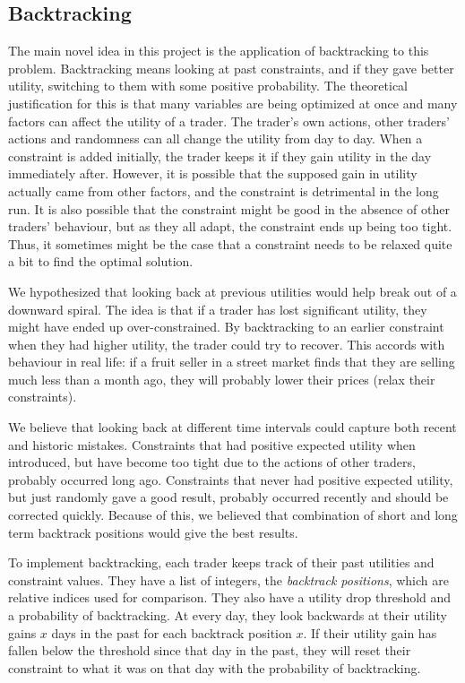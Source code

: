 \documentclass[12pt,a4paper,titlepage]{article}
\begin{document}
\subsection{Backtracking}\label{backtrack}

The main novel idea in this project is the application of backtracking to this problem.
Backtracking means looking at past constraints, and if they gave better utility, switching to them with some positive probability.
The theoretical justification for this is that many variables are being optimized at once and many factors can affect the utility of a trader.
The trader's own actions, other traders' actions and randomness can all change the utility from day to day.
When a constraint is added initially, the trader keeps it if they gain utility in the day immediately after.
However, it is possible that the supposed gain in utility actually came from other factors, and the constraint is detrimental in the long run.
It is also possible that the constraint might be good in the absence of other traders' behaviour, but as they all adapt, the constraint ends up being too tight.
Thus, it sometimes might be the case that a constraint needs to be relaxed quite a bit to find the optimal solution.

We hypothesized that looking back at previous utilities would help break out of a downward spiral.
The idea is that if a trader has lost significant utility, they might have ended up over-constrained.
By backtracking to an earlier constraint when they had higher utility, the trader could try to recover.
This accords with behaviour in real life: if a fruit seller in a street market finds that they are selling much less than a month ago, they will probably lower their prices (relax their constraints).

We believe that looking back at different time intervals could capture both recent and historic mistakes.
Constraints that had positive expected utility when introduced, but have become too tight due to the actions of other traders, probably occurred long ago.
Constraints that never had positive expected utility, but just randomly gave a good result, probably occurred recently and should be corrected quickly.
Because of this, we believed that combination of short and long term backtrack positions would give the best results.

To implement backtracking, each trader keeps track of their past utilities and constraint values.
They have a list of integers, the \textit{backtrack positions}, which are relative indices used for comparison.
They also have a utility drop threshold and a probability of backtracking.
At every day, they look backwards at their utility gains $x$ days in the past for each backtrack position $x$.
If their utility gain has fallen below the threshold since that day in the past, they will reset their constraint to what it was on that day with the probability of backtracking.
\end{document}
